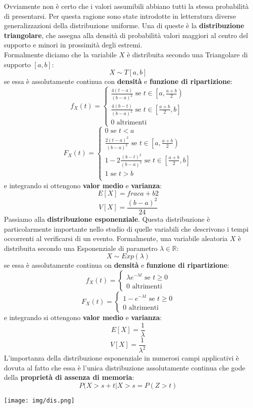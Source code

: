 \documentclass[a4paper,12pt, oneside]{book}
\newcommand{\numberset}{\mathbb}
\newcommand{\R}{\numberset{R}}
\begin{document}
Ovviamente non è certo che i valori assumibili abbiano tutti la stessa probabilità di presentarsi. Per questa ragione sono state introdotte in letteratura diverse generalizzazioni
della distribuzione uniforme. Una di queste è la\textbf{ distribuzione triangolare}, che assegna alla densità di probabilità valori maggiori al centro del supporto e minori in prossimità degli estremi.\\
Formalmente diciamo che la variabile $X$ è
distribuita secondo una Triangolare di supporto $[a,b]$:
\[X\sim T[a,b]\]
se essa è assolutamente continua con \textbf{densità} e \textbf{funzione di ripartizione}:
\[f_X(t)=\begin{cases}
\frac{4(t-a)}{(b-a)^2} \mbox{ se } t\in\left[a,\frac{a+b}{2}\right)\\
\frac{4(b-t)}{(b-a)^2} \mbox{ se } t\in\left[\frac{a+b}{2},b\right]\\
0 \mbox{ altrimenti}
\end{cases}\]
\[F_X(t)=\begin{cases}
0 \mbox{ se } t<a\\
\frac{2(t-a)^2}{(b-a)^2} \mbox{ se } t\in\left[a,\frac{a+b}{2}\right)\\
1-2\frac{(b-t)^2}{(b-a)^2} \mbox{ se } t\in\left[\frac{a+b}{2},b\right]\\
1 \mbox{ se } t>b\\
\end{cases}\]
e integrando si ottengono \textbf{valor medio} e \textbf{varianza}:
\[E[X]=frac{a+b}{2}\]
\[V[X]=\frac{(b-a)^2}{24}\]
\newpage
Passiamo alla \textbf{distribuzione esponenziale}.  Questa distribuzione è particolarmente importante nello studio di quelle variabili che
descrivono i tempi occorrenti al verificarsi di un evento. Formalmente, una variabile aleatoria $X$ è distribuita secondo una Esponenziale di
parametro $\lambda\in\R$:
\[X\sim Exp(\lambda)\]
se essa è assolutamente continua on \textbf{densità} e \textbf{funzione di ripartizione}:
\[f_X(t)=\begin{cases}
\lambda e^{-\lambda t} \mbox{ se } t\geq 0\\
0 \mbox{ altrimenti}
\end{cases}\]
\[F_X(t)=\begin{cases}
1-e^{-\lambda t} \mbox{ se } t\geq 0\\
0 \mbox{ altrimenti}
\end{cases}\]
e integrando si ottengono \textbf{valor medio} e \textbf{varianza}:
\[E[X]=\frac{1}{\lambda}\]
\[V[X]=\frac{1}{\lambda^2}\]
L'importanza della distribuzione esponenziale in numerosi campi applicativi è dovuta al fatto che essa è l’unica distribuzione assolutamente continua che gode della \textbf{proprietà di assenza di memoria}:
\[P(X>s+t|X>s=P(Z>t)\]
\begin{center}
	\texttt{[image: img/dis.png]}
\end{center}
\end{document}
